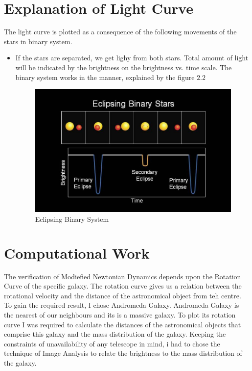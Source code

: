 \section*{Explanation of Light Curve}

The light curve is plotted as a consequence of the following movements of the stars in binary system.

\begin{itemize}
\item
If the stars are separated, we get lighy from both stars. Total amount of light will be indicated by the brightness on the brightness vs. time scale.
The binary system works in the manner, explained by the figure $2.2$ 
\cite{sys}
\begin{figure} [h]
\centering
\includegraphics[scale=0.5]{Light}
\caption{Eclipsing Binary System}
\end{figure}

\end{itemize}

\section{Computational Work}
The verification of Modiefied Newtonian Dynamics depends upon the Rotation Curve of the specific galaxy. The rotation curve gives us a relation between the rotational velocity and the distance of the astronomical object from teh centre. To gain the required result, I chose Andromeda Galaxy. Andromeda Galaxy is the nearest of our neighbours and its is a massive galaxy. To plot its rotation curve I was required to calculate the distances of the astronomical objects that comprise this galaxy and the mass distribution of the galaxy. Keeping the constraints of unavailability of any telescope in mind, i had to chose the technique of Image Analysis to relate the brightness to the mass distribution of the galaxy.
